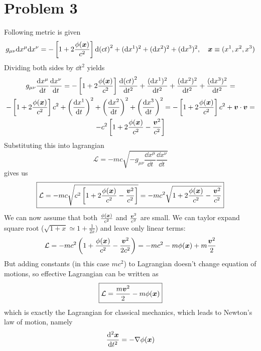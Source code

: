 \section*{Problem 3}
Following metric is given
%
\begin{equation}
    g_{\mu\nu}\dd x^\mu \dd x^\nu =
    -\left[1+2\frac{\phi(\boldsymbol{x})}{c^2}\right] \dd(ct)^2 +
    (\dd x^1)^2 + (\dd x^2)^2 + (\dd x^3)^2, \quad \boldsymbol{x} \equiv (x^1,x^2,x^3)
\end{equation}
%
Dividing both sides by $\dd t^2$ yields
%
\begin{multline}
    g_{\mu\nu}\frac{\dd x^\mu}{\dd t} \frac{\dd x^\nu}{\dd t} =
    -\left[1+2\frac{\phi(\boldsymbol{x})}{c^2}\right] \frac{\dd(ct)^2}{\dd t^2} +
    \frac{(\dd x^1)^2}{\dd t^2} + \frac{(\dd x^2)^2}{\dd t^2} + \frac{(\dd x^3)^2}{\dd t^2} = \\
    -\left[1+2\frac{\phi(\boldsymbol{x})}{c^2}\right] c^2 +
    \left(\frac{\dd x^1}{\dd t}\right)^2 +
    \left(\frac{\dd x^2}{\dd t}\right)^2 +
    \left(\frac{\dd x^3}{\dd t}\right)^2 =
    -\left[1+2\frac{\phi(\boldsymbol{x})}{c^2}\right] c^2 +
    \boldsymbol{v}\cdot\boldsymbol{v} = \\
    -c^2 \left[1+2\frac{\phi(\boldsymbol{x})}{c^2} -
        \frac{\boldsymbol{v}^2}{c^2}\right]
\end{multline}
%
Substituting this into lagrangian
%
\begin{equation}
    \mathcal{L} = -mc\sqrt{-g_{\mu\nu}\frac{\dd x^\mu}{\dd t}\frac{\dd x^\nu}{\dd t}}
\end{equation}
%
gives us
%
\begin{equation}
    \boxed{\mathcal{L} = -mc \sqrt{c^2 \left[1+2\frac{\phi(\boldsymbol{x})}{c^2} -
            \frac{\boldsymbol{v}^2}{c^2}\right]} =
    -mc^2\sqrt{1+2\frac{\phi(\boldsymbol{x})}{c^2} -
        \frac{\boldsymbol{v}^2}{c^2}}}
\end{equation}
%
We can now assume that both $\frac{\phi(\boldsymbol{x})}{c^2}$ and
$\frac{\boldsymbol{v}^2}{c^2}$ are small. We can taylor expand square root ($\sqrt{1+x}
\simeq 1 + \frac{1}{2x}$) and leave only linear terms:
%
\begin{equation}
    \mathcal{L} = -mc^2 \left(1 + \frac{\phi(\boldsymbol{x})}{c^2} - \frac{\boldsymbol{v}^2}{2c^2}\right) = 
    -mc^2 - m\phi(\boldsymbol{x}) + m\frac{\boldsymbol{v}^2}{2}
\end{equation}
%
But adding constants (in this case $mc^2$) to Lagrangian doesn't change equation
of motions, so effective Lagrangian can be written as 
%
\begin{equation}
    \boxed{\mathcal{L} = \frac{m\boldsymbol{v}^2}{2} - m\phi(\boldsymbol{x})}
\end{equation}
%
which is exactly the Lagrangian for classical mechanics, which leads to Newton's
law of motion, namely 
%
\begin{equation}
    \frac{\dd^2 \boldsymbol{x}}{\dd t^2} = - \nabla\phi(\boldsymbol{x})
\end{equation}
